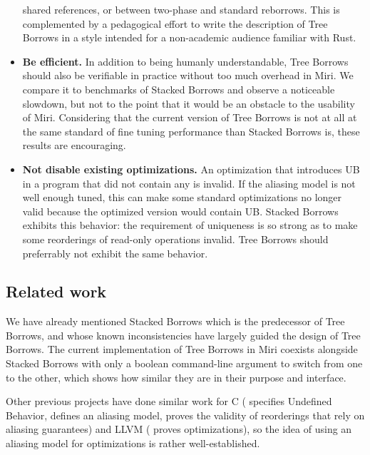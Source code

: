 \documentclass[a4paper,11pt]{article}
\theoremstyle{plain}
\theoremstyle{definition}
\theoremstyle{remark}
\begin{document}
\begin{itemize}
        shared references, or between two-phase and standard reborrows.
        This is complemented by a pedagogical effort to write the
        description of Tree Borrows \cite{perso_treebor}
        in a style intended for a non-academic audience familiar with Rust.
    \item \textbf{Be efficient.} In addition to being humanly understandable, Tree Borrows
        should also be verifiable in practice without too much overhead in Miri.
        We compare it to benchmarks of Stacked Borrows and observe a noticeable slowdown,
        but not to the point that it would be an obstacle to the usability of Miri.
        Considering that the current version of Tree Borrows is not at all at the
        same standard of fine tuning performance than Stacked Borrows is, these
        results are encouraging.
    \item \textbf{Not disable existing optimizations.} An optimization that introduces
        UB in a program that did not contain any is invalid. If the aliasing model
        is not well enough tuned, this can make some standard optimizations no
        longer valid because the optimized version would contain UB.
        Stacked Borrows exhibits this behavior: the requirement of uniqueness
        is so strong as to make some reorderings of read-only operations invalid.
        Tree Borrows should preferrably not exhibit the same behavior.
\end{itemize}

\subsection{Related work}

We have already mentioned Stacked Borrows \cite{stacked_borrows} which is the
predecessor of Tree Borrows, and whose known inconsistencies have largely guided
the design of Tree Borrows. The current implementation of Tree Borrows in
Miri \cite{miri} coexists alongside Stacked Borrows with only a boolean
command-line argument to switch from one to the other, which shows how similar
they are in their purpose and interface.

Other previous projects have done similar work for C
(\cite{c_undef} specifies Undefined Behavior, \cite{c_aliasing_model} defines
an aliasing model, \cite{c_reorderings} proves the validity of reorderings that
rely on aliasing guarantees) and LLVM (\cite{llvm_opts} proves optimizations),
so the idea of using an aliasing model for optimizations is rather well-established.
\end{document}
